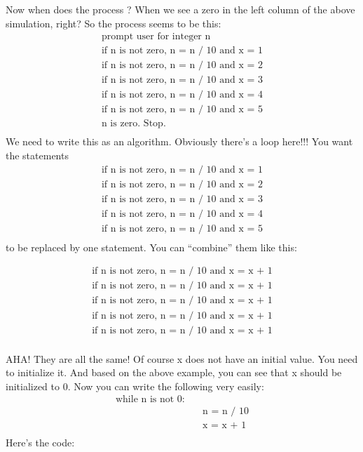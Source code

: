 Now when does the process ? When we see a zero in the left
column of the above simulation, right? So the process seems to be this:
\begin{align*}
\text{prompt user for integer n}\\
\text{if n is not zero, n = n / 10 and x = 1}\\
\text{if n is not zero, n = n / 10 and x = 2}\\
\text{if n is not zero, n = n / 10 and x = 3}\\
\text{if n is not zero, n = n / 10 and x = 4}\\
\text{if n is not zero, n = n / 10 and x = 5}\\
\text{n is zero. Stop.}\\
\end{align*}
We need to write this as an algorithm. Obviously there's
a loop here!!! You want the statements
\begin{align*}
\text{if n is not zero, n = n / 10 and x = 1}\\
\text{if n is not zero, n = n / 10 and x = 2}\\
\text{if n is not zero, n = n / 10 and x = 3}\\
\text{if n is not zero, n = n / 10 and x = 4}\\
\text{if n is not zero, n = n / 10 and x = 5}\\
\end{align*}
to be replaced by one statement. You can ``combine'' them like this:

\begin{align*}
\text{if n is not zero, n = n / 10 and x = x + 1}\\
\text{if n is not zero, n = n / 10 and x = x + 1}\\
\text{if n is not zero, n = n / 10 and x = x + 1}\\
\text{if n is not zero, n = n / 10 and x = x + 1}\\
\text{if n is not zero, n = n / 10 and x = x + 1}\\
\end{align*}

AHA! They are all the same! Of course x does not have an initial value.
You need to initialize it. And based on the above example, you can see
that x should be initialized to 0. Now you can write the following very
easily:
\begin{align*}
\text{while n is not 0:}\\
&\quad\text{n = n / 10}\\
&\quad\text{x = x + 1}\\
\end{align*}
Here's the code:

